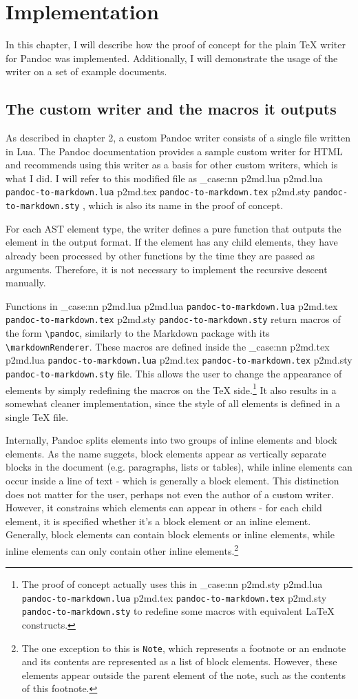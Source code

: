 \documentclass[
  digital,     %
  oneside,     %
  nosansbold,  %
  nocolorbold, %
  lof,         %
  lot,         %
]{fithesis4}
\newcommand\macro[1]{\texttt{\textbackslash{}{#1}}}
\newcommand\pandoc[1]{\macro{pandoc\-{#1}}}
\newcommand\renderer[1]{\macro{markdown\-Renderer\-{#1}}}
\newcommand\file[1]
  {
    \str_case:nn
      { #1 }
      {
        { p2md.lua } { \texttt{pandoc\hyp{}to\hyp{}markdown.lua} }
        { p2md.tex } { \texttt{pandoc\hyp{}to\hyp{}markdown.tex} }
        { p2md.sty } { \texttt{pandoc\hyp{}to\hyp{}markdown.sty} }
      }
  }
\begin{document}
\chapter{Implementation}
In this chapter, I will describe how the proof of concept for the plain \TeX{} writer for Pandoc was implemented. Additionally, I will demonstrate the usage of the writer on a set of example documents.

\section{The custom writer and the macros it outputs}
As described in chapter 2, a custom Pandoc writer consists of a single file written in Lua. The Pandoc documentation provides a sample custom writer for HTML and recommends using this writer as a basis for other custom writers, which is what I did. I will refer to this modified file as \file{p2md.lua}, which is also its name in the proof of concept.

For each AST element type, the writer defines a pure function that outputs the element in the output format. If the element has any child elements, they have already been processed by other functions by the time they are passed as arguments. Therefore, it is not necessary to implement the recursive descent manually.

Functions in \file{p2md.lua} return macros of the form \pandoc{ElementName}, similarly to the Markdown package with its \renderer{ElementName}. These macros are defined inside the \file{p2md.tex} file. This allows the user to change the appearance of elements by simply redefining the macros on the \TeX{} side.\footnote{The proof of concept actually uses this in \file{p2md.sty} to redefine some macros with equivalent \LaTeX{} constructs.} It also results in a somewhat cleaner implementation, since the style of all elements is defined in a single \TeX{} file. 

Internally, Pandoc splits elements into two groups of inline elements and block elements. As the name suggets, block elements appear as vertically separate blocks in the document (e.g. paragraphs, lists or tables), while inline elements can occur inside a line of text - which is generally a block element. This distinction does not matter for the user, perhaps not even the author of a custom writer. However, it constrains which elements can appear in others - for each child element, it is specified whether it's a block element or an inline element. Generally, block elements can contain block elements or inline elements, while inline elements can only contain other inline elements.\footnote{The one exception to this is \texttt{Note}, which represents a footnote or an endnote and its contents are represented as a list of block elements. However, these elements appear outside the parent element of the note, such as the contents of this footnote.}
\end{document}

